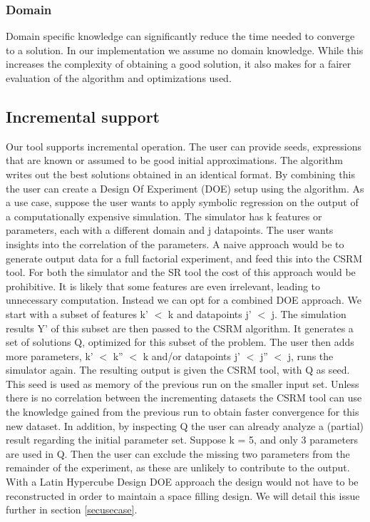 \subsubsection{Domain}
Domain specific knowledge can significantly reduce the time needed to converge to a solution. In our implementation we assume no domain knowledge. While this increases the complexity of obtaining a good solution, it also makes for a fairer evaluation of the algorithm and optimizations used.

\subsection{Incremental support} %
Our tool supports incremental operation. The user can provide seeds, expressions that are known or assumed to be good initial approximations. The algorithm writes out the best solutions obtained in an identical format. By combining this the user can create a Design Of Experiment (DOE) setup using the algorithm. As a use case, suppose the user wants to apply symbolic regression on the output of a computationally expensive simulation. The simulator has k features or parameters, each with a different domain and j datapoints. The user wants insights into the correlation of the parameters. 
A naive approach would be to generate output data for a full factorial experiment, and feed this into the CSRM tool. For both the simulator and the SR tool the cost of this approach would be prohibitive. It is likely that some features are even irrelevant, leading to unnecessary computation. Instead we can opt for a combined DOE approach. We start with a subset of features k' $<$ k and datapoints j' $<$ j. The simulation results Y' of this subset are then passed to the CSRM algorithm. It generates a set of solutions Q, optimized for this subset of the problem. 
The user then adds more parameters, k' $<$ k'' $<$ k and/or datapoints j' $<$ j'' $<$ j, runs the simulator again. The resulting output is given the CSRM tool, with Q as seed. This seed is used as memory of the previous run on the smaller input set. Unless there is no correlation between the incrementing datasets the CSRM tool can use the knowledge gained from the previous run to obtain faster convergence for this new dataset. In addition, by inspecting Q the user can already analyze a (partial) result regarding the initial parameter set. 
Suppose k = 5, and only 3 parameters are used in Q. Then the user can exclude the missing two parameters from the remainder of the experiment, as these are unlikely to contribute to the output. With a Latin Hypercube Design DOE approach the design would not have to be reconstructed in order to maintain a space filling design. We will detail this issue further in section \ref{secusecase}.
